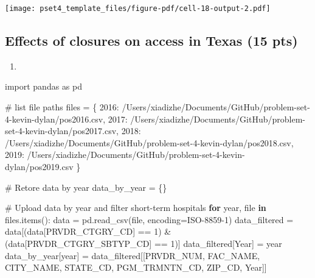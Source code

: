 \documentclass[
  letterpaper,
  DIV=11,
  numbers=noendperiod]{scrartcl}
\newenvironment{Shaded}{\begin{snugshade}}{\end{snugshade}}
\newcommand{\BuiltInTok}[1]{\textcolor[rgb]{0.00,0.23,0.31}{#1}}
\newcommand{\CommentTok}[1]{\textcolor[rgb]{0.37,0.37,0.37}{#1}}
\newcommand{\ControlFlowTok}[1]{\textcolor[rgb]{0.00,0.23,0.31}{\textbf{#1}}}
\newcommand{\DecValTok}[1]{\textcolor[rgb]{0.68,0.00,0.00}{#1}}
\newcommand{\ImportTok}[1]{\textcolor[rgb]{0.00,0.46,0.62}{#1}}
\newcommand{\KeywordTok}[1]{\textcolor[rgb]{0.00,0.23,0.31}{\textbf{#1}}}
\newcommand{\NormalTok}[1]{\textcolor[rgb]{0.00,0.23,0.31}{#1}}
\newcommand{\OperatorTok}[1]{\textcolor[rgb]{0.37,0.37,0.37}{#1}}
\newcommand{\StringTok}[1]{\textcolor[rgb]{0.13,0.47,0.30}{#1}}
\providecommand{\tightlist}{%
  \setlength{\itemsep}{0pt}\setlength{\parskip}{0pt}}\usepackage{longtable,booktabs,array}
\begin{document}
\texttt{[image: pset4\_template\_files/figure-pdf/cell-18-output-2.pdf]}

\subsection{Effects of closures on access in Texas (15
pts)}\label{effects-of-closures-on-access-in-texas-15-pts}

\begin{enumerate}
\def\labelenumi{\arabic{enumi}.}
\tightlist
\item
\end{enumerate}

\begin{Shaded}
\begin{Highlighting}[]
\ImportTok{import}\NormalTok{ pandas }\ImportTok{as}\NormalTok{ pd}

\CommentTok{\# list file paths}
\NormalTok{files }\OperatorTok{=}\NormalTok{ \{}
    \DecValTok{2016}\NormalTok{: }\StringTok{\textquotesingle{}/Users/xiadizhe/Documents/GitHub/problem{-}set{-}4{-}kevin{-}dylan/pos2016.csv\textquotesingle{}}\NormalTok{,}
    \DecValTok{2017}\NormalTok{: }\StringTok{\textquotesingle{}/Users/xiadizhe/Documents/GitHub/problem{-}set{-}4{-}kevin{-}dylan/pos2017.csv\textquotesingle{}}\NormalTok{,}
    \DecValTok{2018}\NormalTok{: }\StringTok{\textquotesingle{}/Users/xiadizhe/Documents/GitHub/problem{-}set{-}4{-}kevin{-}dylan/pos2018.csv\textquotesingle{}}\NormalTok{,}
    \DecValTok{2019}\NormalTok{: }\StringTok{\textquotesingle{}/Users/xiadizhe/Documents/GitHub/problem{-}set{-}4{-}kevin{-}dylan/pos2019.csv\textquotesingle{}}
\NormalTok{\}}

\CommentTok{\# Retore data by year}
\NormalTok{data\_by\_year }\OperatorTok{=}\NormalTok{ \{\}}

\CommentTok{\# Upload data by year and filter short{-}term hospitals}
\ControlFlowTok{for}\NormalTok{ year, }\BuiltInTok{file} \KeywordTok{in}\NormalTok{ files.items():}
\NormalTok{    data }\OperatorTok{=}\NormalTok{ pd.read\_csv(}\BuiltInTok{file}\NormalTok{, encoding}\OperatorTok{=}\StringTok{\textquotesingle{}ISO{-}8859{-}1\textquotesingle{}}\NormalTok{)}
\NormalTok{    data\_filtered }\OperatorTok{=}\NormalTok{ data[(data[}\StringTok{\textquotesingle{}PRVDR\_CTGRY\_CD\textquotesingle{}}\NormalTok{] }\OperatorTok{==} \DecValTok{1}\NormalTok{) }\OperatorTok{\&}\NormalTok{ (data[}\StringTok{\textquotesingle{}PRVDR\_CTGRY\_SBTYP\_CD\textquotesingle{}}\NormalTok{] }\OperatorTok{==} \DecValTok{1}\NormalTok{)]}
\NormalTok{    data\_filtered[}\StringTok{\textquotesingle{}Year\textquotesingle{}}\NormalTok{] }\OperatorTok{=}\NormalTok{ year  }
\NormalTok{    data\_by\_year[year] }\OperatorTok{=}\NormalTok{ data\_filtered[[}\StringTok{\textquotesingle{}PRVDR\_NUM\textquotesingle{}}\NormalTok{, }\StringTok{\textquotesingle{}FAC\_NAME\textquotesingle{}}\NormalTok{, }\StringTok{\textquotesingle{}CITY\_NAME\textquotesingle{}}\NormalTok{, }\StringTok{\textquotesingle{}STATE\_CD\textquotesingle{}}\NormalTok{, }\StringTok{\textquotesingle{}PGM\_TRMNTN\_CD\textquotesingle{}}\NormalTok{, }\StringTok{\textquotesingle{}ZIP\_CD\textquotesingle{}}\NormalTok{, }\StringTok{\textquotesingle{}Year\textquotesingle{}}\NormalTok{]]}


\end{Highlighting}
\end{Shaded}
\end{document}
